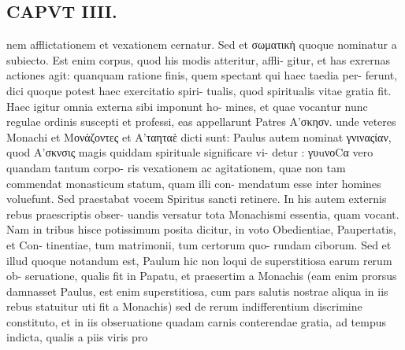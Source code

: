 \documentclass{article}
\begin{document}
\begin{pages}
\section*{CAPVT  IIII. }
\marginpar{[ p.209 ]}nem afflictationem et vexationem cernatur. Sed et σωματικὴ quoque nominatur a subiecto. Est enim corpus, quod his modis atteritur, affli- gitur, et has exrernas actiones agit: quanquam ratione finis, quem spectant qui haec taedia per- ferunt, dici quoque potest haec exercitatio spiri- tualis, quod spiritualis vitae gratia fit. Haec igitur omnia externa sibi imponunt ho- mines, et quae vocantur nunc regulae ordinis suscepti et professi, eas appellarunt Patres Α’σκησν. unde veteres Monachi et Μονάζοντες et Α’ταηταὲ dicti sunt: Paulus autem nominat γνιναςίαν, quod Α'σκνσις magis quiddam spirituale significare vi- detur : γυuνοCα vero quandam tantum corpo- ris vexationem ac agitationem, quae non tam commendat monasticum statum, quam illi con- mendatum esse inter homines voluefunt. Sed praestabat vocem Spiritus sancti retinere. In his autem externis rebus praescriptis obser- uandis versatur tota Monachismi essentia, quam vocant. Nam in tribus hisce potissimum posita dicitur, in voto Obedientiae, Paupertatis, et Con- tinentiae, tum matrimonii, tum certorum quo- rundam ciborum. Sed et illud quoque notandum est, Paulum hic non loqui de superstitiosa earum rerum ob- seruatione, qualis fit in Papatu, et praesertim a Monachis (eam enim prorsus damnasset Paulus, est enim superstitiosa, cum pars salutis nostrae aliqua in iis rebus statuitur uti fit a Monachis) sed de rerum indifferentium discrimine constituto, et in iis obseruatione quadam carnis conterendae gratia, ad tempus indicta, qualis a piis viris pro 

\end{pages}
\end{document}
